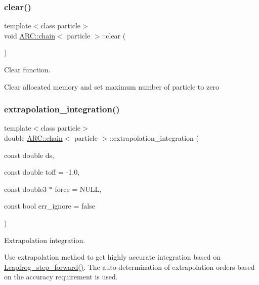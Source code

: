\subsubsection{\texorpdfstring{clear()}{clear()}}
{\footnotesize\ttfamily template$<$class particle$>$ \\
void \hyperlink{classARC_1_1chain}{A\+R\+C\+::chain}$<$ particle $>$\+::clear (\begin{DoxyParamCaption}{ }\end{DoxyParamCaption})\hspace{0.3cm}{\ttfamily [inline]}}



Clear function. 

Clear allocated memory and set maximum number of particle to zero \hypertarget{classARC_1_1chain_a0eb7768cb1b9099bbf66124d4c00164c}{}\label{classARC_1_1chain_a0eb7768cb1b9099bbf66124d4c00164c} 
\subsubsection{\texorpdfstring{extrapolation\+\_\+integration()}{extrapolation\_integration()}}
{\footnotesize\ttfamily template$<$class particle$>$ \\
double \hyperlink{classARC_1_1chain}{A\+R\+C\+::chain}$<$ particle $>$\+::extrapolation\+\_\+integration (\begin{DoxyParamCaption}\item[{const double}]{ds,  }\item[{const double}]{toff = {\ttfamily -\/1.0},  }\item[{const double3 $\ast$}]{force = {\ttfamily NULL},  }\item[{const bool}]{err\+\_\+ignore = {\ttfamily false} }\end{DoxyParamCaption})\hspace{0.3cm}{\ttfamily [inline]}}



Extrapolation integration. 

Use extrapolation method to get highly accurate integration based on \hyperlink{classARC_1_1chain_a82b26731761231d86fd2e0b4529df6fa}{Leapfrog\+\_\+step\+\_\+forward()}. The auto-\/determination of extrapolation orders based on the accuracy requirement is used.


